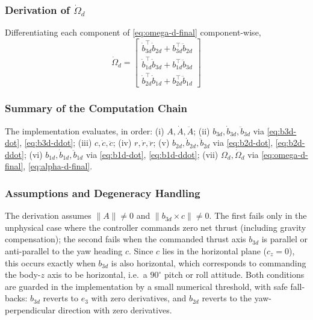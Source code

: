 \documentclass[11pt]{article}
\theoremstyle{remark}
\begin{document}
\subsubsection{Derivation of $\dot\Omega_d$}
Differentiating each component of \eqref{eq:omega-d-final} component-wise,
\begin{equation}
\boxed{\quad\dot\Omega_d =
\begin{bmatrix}
\dot b_{3d}^\top\dot b_{2d} + b_{3d}^\top\ddot b_{2d}\\
\dot b_{1d}^\top\dot b_{3d} + b_{1d}^\top\ddot b_{3d}\\
\dot b_{2d}^\top\dot b_{1d} + b_{2d}^\top\ddot b_{1d}
\end{bmatrix}\quad}
\label{eq:alpha-d-final}
\end{equation}

\subsubsection{Summary of the Computation Chain}
The implementation evaluates, in order: (i) $A, \dot A, \ddot A$; (ii) $b_{3d}, \dot b_{3d}, \ddot b_{3d}$ via \eqref{eq:b3d-dot}, \eqref{eq:b3d-ddot}; (iii) $c, \dot c, \ddot c$; (iv) $r, \dot r, \ddot r$; (v) $b_{2d}, \dot b_{2d}, \ddot b_{2d}$ via \eqref{eq:b2d-dot}, \eqref{eq:b2d-ddot}; (vi) $b_{1d}, \dot b_{1d}, \ddot b_{1d}$ via \eqref{eq:b1d-dot}, \eqref{eq:b1d-ddot}; (vii) $\Omega_d, \dot\Omega_d$ via \eqref{eq:omega-d-final}, \eqref{eq:alpha-d-final}.

\subsubsection{Assumptions and Degeneracy Handling}
The derivation assumes $\|A\| \neq 0$ and $\|b_{3d}\times c\| \neq 0$. The first fails only in the unphysical case where the controller commands zero net thrust (including gravity compensation); the second fails when the commanded thrust axis $b_{3d}$ is parallel or anti-parallel to the yaw heading $c$. Since $c$ lies in the horizontal plane ($c_z = 0$), this occurs exactly when $b_{3d}$ is also horizontal, which corresponds to commanding the body-$z$ axis to be horizontal, i.e.\ a $90^\circ$ pitch or roll attitude. Both conditions are guarded in the implementation by a small numerical threshold, with safe fall-backs: $b_{3d}$ reverts to $e_3$ with zero derivatives, and $b_{2d}$ reverts to the yaw-perpendicular direction with zero derivatives.

\newpage
\end{document}
